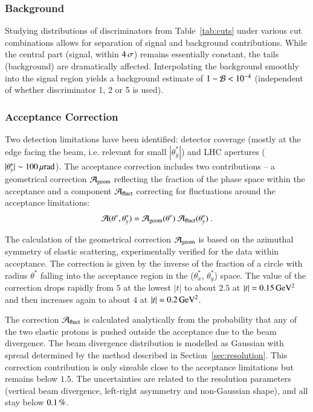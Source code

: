 
\subsubsection{Background}
\label{sec:background}

Studying distributions of discriminators from Table~\ref{tab:cuts} under various cut combinations allows for separation of signal and background contributions. While the central part (signal, within $4\,{\rm \sigma}$) remains essentially constant, the tails (background) are dramatically affected. Interpolating the background smoothly into the signal region yields a background estimate of $1 - {\cal B} < 10^{-4}$ (independent of whether discriminator 1, 2 or 5 is used).


\subsubsection{Acceptance Correction}
\label{sec:acc corr}

Two detection limitations have been identified: detector coverage (mostly at the edge facing the beam, i.e. relevant for small $|\theta_y^*|$) and LHC apertures ($|\theta_y^*| \sim 100\,{\rm \mu rad}$). The acceptance correction includes two contributions -- a geometrical correction ${\cal A}_{\rm geom}$ reflecting the fraction of the phase space within the acceptance and a component ${\cal A}_{\rm fluct}$ correcting for fluctuations around the acceptance limitations:
\begin{equation}
{\cal A}(\theta^*, \theta_y^*) = {\cal A}_{\rm geom}(\theta^*)\ {\cal A}_{\rm fluct}(\theta_y^*)\ .
\end{equation}

The calculation of the geometrical correction ${\cal A}_{\rm geom}$ is based on the azimuthal symmetry of elastic scattering, experimentally verified for the data within acceptance. The correction is given by the inverse of the fraction of a circle with radius $\theta^*$ falling into the acceptance region in the ($\theta_x^*$, $\theta_y^*$) space. The value of the correction drops rapidly from $5$ at the lowest $|t|$ to about $2.5$ at $|t| = 0.15\,{\rm GeV^2}$ and then increases again to about $4$ at $|t| = 0.2\,{\rm GeV^2}$.

The correction ${\cal A}_{\rm fluct}$ is calculated analytically from the probability that any of the two elastic protons is pushed outside the acceptance due to the beam divergence. The beam divergence distribution is modelled as Gaussian with spread determined by the method described in Section~\ref{sec:resolution}. This correction contribution is only sizeable close to the acceptance limitations but remains below $1.5$. The uncertainties are related to the resolution parameters (vertical beam divergence, left-right asymmetry and non-Gaussian shape), and all stay below $0.1\,{\rm \%}$.


